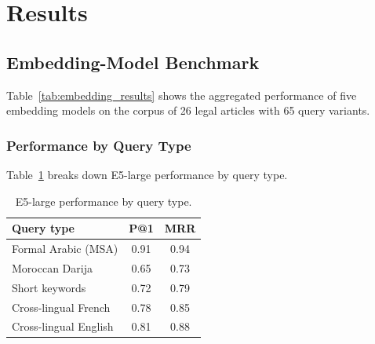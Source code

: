 \section{Results}
\label{sec:results}

\subsection{Embedding-Model Benchmark}

Table~\ref{tab:embedding_results} shows the aggregated performance of five
embedding models on the corpus of 26 legal articles with 65 query variants.

\begin{table}[t]
\centering
\caption{Embedding-model benchmark results.}
\label{tab:embedding_results}
\small
{}
\end{table}

\subsubsection{Performance by Query Type}

Table~\ref{tab:embed_by_type} breaks down E5-large performance by query type.

\begin{table}[t]
\centering
\caption{E5-large performance by query type.}
\label{tab:embed_by_type}
\small
\begin{tabular}{lcc}
\toprule
\textbf{Query type} & \textbf{P@1} & \textbf{MRR} \\
\midrule
Formal Arabic (MSA)    & 0.91 & 0.94 \\
Moroccan Darija        & 0.65 & 0.73 \\
Short keywords         & 0.72 & 0.79 \\
Cross-lingual French   & 0.78 & 0.85 \\
Cross-lingual English  & 0.81 & 0.88 \\
\bottomrule
\end{tabular}
\end{table}

